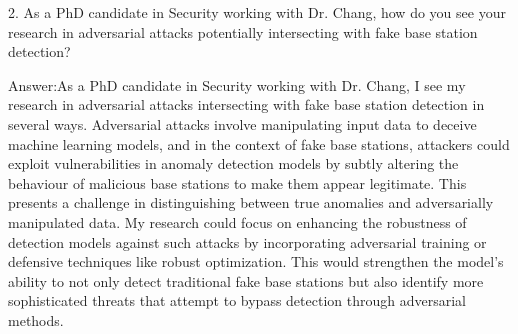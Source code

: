 2. As a PhD candidate in Security working with Dr. Chang, how do you see your research in adversarial attacks potentially intersecting with fake base station detection?

Answer:As a PhD candidate in Security working with Dr. Chang, I see my research in adversarial attacks intersecting with fake base station detection in several ways. Adversarial attacks involve manipulating input data to deceive machine learning models, and in the context of fake base stations, attackers could exploit vulnerabilities in anomaly detection models by subtly altering the behaviour of malicious base stations to make them appear legitimate. This presents a challenge in distinguishing between true anomalies and adversarially manipulated data. My research could focus on enhancing the robustness of detection models against such attacks by incorporating adversarial training or defensive techniques like robust optimization. This would strengthen the model's ability to not only detect traditional fake base stations but also identify more sophisticated threats that attempt to bypass detection through adversarial methods.
